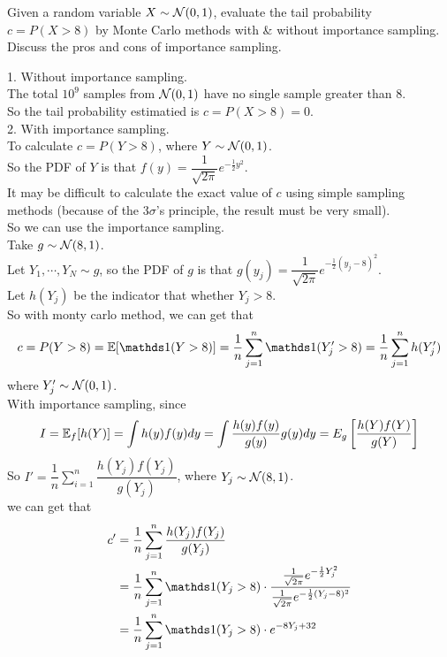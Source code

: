 \begin{homeworkProblem}

Given a random variable $X \sim \mathcal{N}(0,1)$, evaluate the tail probability $c=P(X>8)$ by Monte Carlo methods with \& without importance sampling. Discuss the pros and cons of importance sampling.

\solution

1. Without importance sampling. \\
The total $10^9$ samples from $\mathcal{N}(0,1)$ have no single sample greater than 8. \\
So the tail probability estimatied is $c=P(X>8)=0$. \\

2. With importance sampling. \\
To calculate $c=P(Y>8)$, where $Y\sim \mathcal{N}(0,1)$. \\
So the PDF of $Y$ is that $f(y)=\dfrac{1}{\sqrt{2\pi}}e^{-\frac{1}{2}y^2}$. \\
It may be difficult to calculate the exact value of $c$ using simple sampling methods (because of the 3$\sigma$'s principle, the result must be very small). \\
So we can use the importance sampling. \\
Take $g\sim \mathcal{N}(8,1)$. \\
Let $Y_1,\cdots,Y_N\sim g$, so the PDF of $g$ is that $g(y_j)=\dfrac{1}{\sqrt{2\pi}}e^{-\frac{1}{2}(y_j-8)^2}$. \\
Let $h(Y_j)$ be the indicator that whether $Y_j>8$. \\

So with monty carlo method, we can get that \\
$$c=P(Y>8)=\E[\I(Y>8)]=\dfrac{1}{n}\sum_{j=1}^n\I(Y_j'>8)=\dfrac{1}{n}\sum_{j=1}^nh(Y_j')$$
where $Y_j'\sim \mathcal{N}(0,1)$.\\

With importance sampling, since
$$I=\mathbb{E}_f[h(Y)]=\int h(y)f(y)dy=\int\dfrac{h(y)f(y)}{g(y)}g(y)dy=E_g\left[\dfrac{h(Y)f(Y)}{g(Y)}\right]$$
So $I'=\dfrac{1}{n}\sum\limits_{i=1}^n\dfrac{h(Y_j)f(Y_j)}{g(Y_j)}$, where $Y_j\sim \mathcal{N}(8,1)$.\\
we can get that
\begin{align*}
c' &= \dfrac{1}{n}\sum_{j=1}^n\dfrac{h(Y_j)f(Y_j)}{g(Y_j)} \\
&= \dfrac{1}{n}\sum_{j=1}^n\I(Y_j>8)\cdot \dfrac{\frac{1}{\sqrt{2\pi}}e^{-\frac{1}{2}Y_j^2}}{\frac{1}{\sqrt{2\pi}}e^{-\frac{1}{2}(Y_j-8)^2}} \\
&= \dfrac{1}{n}\sum_{j=1}^n\I(Y_j>8)\cdot e^{-8Y_j+32}
\end{align*}


\end{homeworkProblem}
